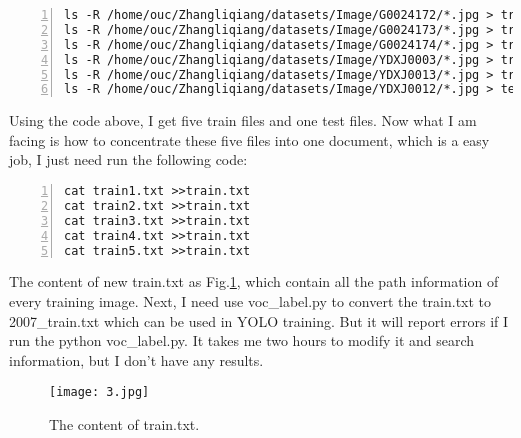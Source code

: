 \documentclass[a4paper]{article}
\begin{document}
\begin{lstlisting}[numbers=left, numberstyle=\tiny,keywordstyle=\color{blue!70},commentstyle=\color{red!50!green!50!blue!50},frame=shadowbox, rulesepcolor=\color{red!20!green!20!blue!20}] 
ls -R /home/ouc/Zhangliqiang/datasets/Image/G0024172/*.jpg > train1.txt
ls -R /home/ouc/Zhangliqiang/datasets/Image/G0024173/*.jpg > train2.txt
ls -R /home/ouc/Zhangliqiang/datasets/Image/G0024174/*.jpg > train3.txt
ls -R /home/ouc/Zhangliqiang/datasets/Image/YDXJ0003/*.jpg > train4.txt
ls -R /home/ouc/Zhangliqiang/datasets/Image/YDXJ0013/*.jpg > train5.txt
ls -R /home/ouc/Zhangliqiang/datasets/Image/YDXJ0012/*.jpg > test.txt
\end{lstlisting}
Using the code above, I get five train files and one test files. Now what I am facing is how to concentrate these five files into one document, which is a easy job, I just need run the following code:
\begin{lstlisting}[numbers=left, numberstyle=\tiny,keywordstyle=\color{blue!70},commentstyle=\color{red!50!green!50!blue!50},frame=shadowbox, rulesepcolor=\color{red!20!green!20!blue!20}] 
cat train1.txt >>train.txt
cat train2.txt >>train.txt
cat train3.txt >>train.txt
cat train4.txt >>train.txt
cat train5.txt >>train.txt
\end{lstlisting}
The content of new train.txt as Fig.\ref{3}, which contain all the path information of every training image. Next, I need use voc\_label.py to convert the train.txt to 2007\_train.txt which can be used in YOLO training. But it will report errors if I run the python voc\_label.py. It takes me two hours to modify it and search information, but I don't have any results. 
\begin{figure}[h]
	\begin{center}
		\texttt{[image: 3.jpg]}\\
		\caption{The content of train.txt.}\label{3}
	\end{center}
\end{figure}
\par
\end{document}
